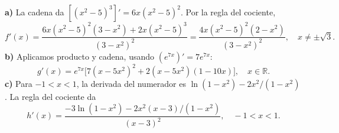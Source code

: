 \textbf{a)} La cadena da $[(x^2-5)^3]'=6x(x^2-5)^2$. Por la regla del cociente,
\[
f'(x)=\frac{6x(x^2-5)^2(3-x^2)+2x(x^2-5)^3}{(3-x^2)^2}
=\frac{4x(x^2-5)^2(2-x^2)}{(3-x^2)^2},
\quad x\ne\pm\sqrt3.
\]
\textbf{b)} Aplicamos producto y cadena, usando $(e^{7x})'=7e^{7x}$:
\[
g'(x)=e^{7x}\bigl[7(x-5x^2)^2+2(x-5x^2)(1-10x)\bigr],
\quad x\in\mathbb R.
\]
\textbf{c)} Para $-1<x<1$, la derivada del numerador es
$\ln(1-x^2)-2x^2/(1-x^2)$. La regla del cociente da
\[
h'(x)=\frac{-3\ln(1-x^2)-2x^2(x-3)/(1-x^2)}{(x-3)^2},
\quad -1<x<1.
\]

